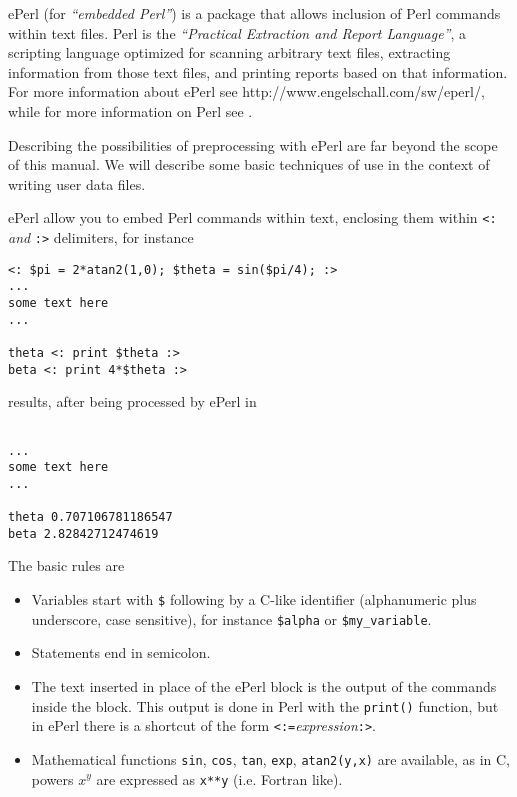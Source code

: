 \label{sec:eperl}  

%
ePerl (for \emph{``embedded Perl''}) is a package that allows
inclusion of Perl commands within text files. Perl is the
\emph{``Practical Extraction and Report Language''}, a scripting
language optimized for scanning arbitrary text files, extracting
information from those text files, and printing reports based on that
information. For more information about ePerl see
{http://www.engelschall.com/sw/eperl/}, while for more information on
Perl see .

Describing the possibilities of preprocessing with ePerl are far
beyond the scope of this manual. We will describe some basic
techniques of use in the context of writing \pfem{} user data files. 


ePerl allow you to embed Perl commands within text, enclosing them
within \verb+<:+\emph{ and  }\verb+:>+ delimiters, for instance

\begin{verbatim}
<: $pi = 2*atan2(1,0); $theta = sin($pi/4); :>
...
some text here
...

theta <: print $theta :>
beta <: print 4*$theta :>
\end{verbatim}

results, after being processed by ePerl in

\begin{verbatim}
 
...
some text here
...

theta 0.707106781186547
beta 2.82842712474619
\end{verbatim}

The basic rules are

\begin{itemize}
\item Variables start with \verb+$+ following by a C-like identifier
(alphanumeric plus underscore, case sensitive), for instance \verb+$alpha+ or
\verb+$my_variable+. 
\item Statements end in semicolon. 
\item The text inserted in place of the ePerl block is the output of
the commands inside the block. This output is done in Perl with
the \verb+print()+ function, but in ePerl there is a shortcut of the
form \verb+<:=+\emph{expression}\verb+:>+. 
\item Mathematical functions \verb+sin+, \verb+cos+, \verb+tan+, \verb+exp+,
        \verb+atan2(y,x)+ are available, as in C, powers $x^y$ are expressed
        as \verb+x**y+ (i.e. Fortran like). 
\end{itemize}

